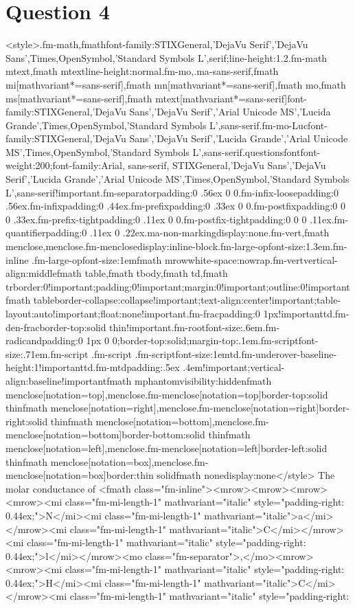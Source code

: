 \documentclass{article}
\begin{document}
\section*{Question 4}
<style>.fm-math,fmath{font-family:STIXGeneral,'DejaVu Serif','DejaVu Sans',Times,OpenSymbol,'Standard Symbols L',serif;line-height:1.2}.fm-math mtext,fmath mtext{line-height:normal}.fm-mo,.ma-sans-serif,fmath mi[mathvariant*=sans-serif],fmath mn[mathvariant*=sans-serif],fmath mo,fmath ms[mathvariant*=sans-serif],fmath mtext[mathvariant*=sans-serif]{font-family:STIXGeneral,'DejaVu Sans','DejaVu Serif','Arial Unicode MS','Lucida Grande',Times,OpenSymbol,'Standard Symbols L',sans-serif}.fm-mo-Luc{font-family:STIXGeneral,'DejaVu Sans','DejaVu Serif','Lucida Grande','Arial Unicode MS',Times,OpenSymbol,'Standard Symbols L',sans-serif}.questionsfont{font-weight:200;font-family:Arial, sans-serif, STIXGeneral,'DejaVu Sans','DejaVu Serif','Lucida Grande','Arial Unicode MS',Times,OpenSymbol,'Standard Symbols L',sans-serif!important}.fm-separator{padding:0 .56ex 0 0}.fm-infix-loose{padding:0 .56ex}.fm-infix{padding:0 .44ex}.fm-prefix{padding:0 .33ex 0 0}.fm-postfix{padding:0 0 0 .33ex}.fm-prefix-tight{padding:0 .11ex 0 0}.fm-postfix-tight{padding:0 0 0 .11ex}.fm-quantifier{padding:0 .11ex 0 .22ex}.ma-non-marking{display:none}.fm-vert,fmath menclose,menclose.fm-menclose{display:inline-block}.fm-large-op{font-size:1.3em}.fm-inline .fm-large-op{font-size:1em}fmath mrow{white-space:nowrap}.fm-vert{vertical-align:middle}fmath table,fmath tbody,fmath td,fmath tr{border:0!important;padding:0!important;margin:0!important;outline:0!important}fmath table{border-collapse:collapse!important;text-align:center!important;table-layout:auto!important;float:none!important}.fm-frac{padding:0 1px!important}td.fm-den-frac{border-top:solid thin!important}.fm-root{font-size:.6em}.fm-radicand{padding:0 1px 0 0;border-top:solid;margin-top:.1em}.fm-script{font-size:.71em}.fm-script .fm-script .fm-script{font-size:1em}td.fm-underover-base{line-height:1!important}td.fm-mtd{padding:.5ex .4em!important;vertical-align:baseline!important}fmath mphantom{visibility:hidden}fmath menclose[notation=top],menclose.fm-menclose[notation=top]{border-top:solid thin}fmath menclose[notation=right],menclose.fm-menclose[notation=right]{border-right:solid thin}fmath menclose[notation=bottom],menclose.fm-menclose[notation=bottom]{border-bottom:solid thin}fmath menclose[notation=left],menclose.fm-menclose[notation=left]{border-left:solid thin}fmath menclose[notation=box],menclose.fm-menclose[notation=box]{border:thin solid}fmath none{display:none}</style> The molar conductance of <fmath class="fm-inline"><mrow><mrow><mrow><mrow><mi class="fm-mi-length-1" mathvariant="italic" style="padding-right: 0.44ex;">N</mi><mi class="fm-mi-length-1" mathvariant="italic">a</mi></mrow><mi class="fm-mi-length-1" mathvariant="italic">C</mi></mrow><mi class="fm-mi-length-1" mathvariant="italic" style="padding-right: 0.44ex;">l</mi></mrow><mo class="fm-separator">,</mo><mrow><mrow><mi class="fm-mi-length-1" mathvariant="italic" style="padding-right: 0.44ex;">H</mi><mi class="fm-mi-length-1" mathvariant="italic">C</mi></mrow><mi class="fm-mi-length-1" mathvariant="italic" style="padding-right: 
\end{document}
